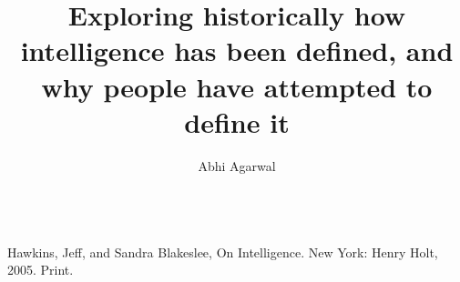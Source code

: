 \documentclass[11pt, oneside]{article}
\title{Exploring historically how intelligence has been defined, and why people have attempted to define it\vspace{-0.4cm}}
\author{Abhi Agarwal\vspace{-1cm}}
\date{}
\begin{document}
\maketitle

\noindent 

\begin{workscited}
\bibent \\
\bibent Hawkins, Jeff, and Sandra Blakeslee, On Intelligence. New York: Henry Holt, 2005.
Print. \\
\end{workscited}
\end{document}
